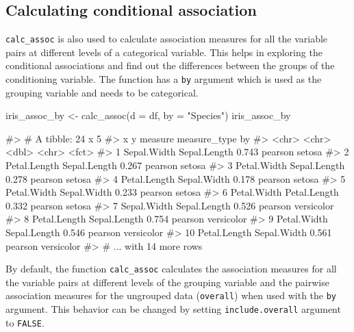\hypertarget{calculating-conditional-association}{%
\subsection{Calculating conditional
association}\label{calculating-conditional-association}}

\texttt{calc\_assoc} is also used to calculate association measures for
all the variable pairs at different levels of a categorical variable.
This helps in exploring the conditional associations and find out the
differences between the groups of the conditioning variable. The
function has a \texttt{by} argument which is used as the grouping
variable and needs to be categorical.

\begin{Schunk}
\begin{Sinput}
iris_assoc_by <- calc_assoc(d = df,
                            by = "Species")
iris_assoc_by
\end{Sinput}
\begin{Soutput}
#> # A tibble: 24 x 5
#>    x            y            measure measure_type by        
#>    <chr>        <chr>          <dbl> <chr>        <fct>     
#>  1 Sepal.Width  Sepal.Length   0.743 pearson      setosa    
#>  2 Petal.Length Sepal.Length   0.267 pearson      setosa    
#>  3 Petal.Width  Sepal.Length   0.278 pearson      setosa    
#>  4 Petal.Length Sepal.Width    0.178 pearson      setosa    
#>  5 Petal.Width  Sepal.Width    0.233 pearson      setosa    
#>  6 Petal.Width  Petal.Length   0.332 pearson      setosa    
#>  7 Sepal.Width  Sepal.Length   0.526 pearson      versicolor
#>  8 Petal.Length Sepal.Length   0.754 pearson      versicolor
#>  9 Petal.Width  Sepal.Length   0.546 pearson      versicolor
#> 10 Petal.Length Sepal.Width    0.561 pearson      versicolor
#> # ... with 14 more rows
\end{Soutput}
\end{Schunk}

By default, the function \texttt{calc\_assoc} calculates the association
measures for all the variable pairs at different levels of the grouping
variable and the pairwise association measures for the ungrouped data
(\texttt{overall}) when used with the \texttt{by} argument. This
behavior can be changed by setting \texttt{include.overall} argument to
\texttt{FALSE}.

